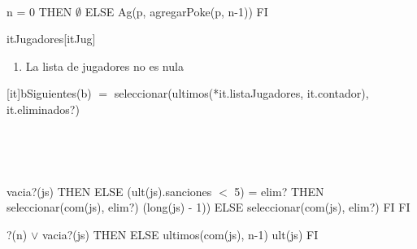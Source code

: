 \begin{Representacion}
	~

	{\IF n = 0 THEN
		$\emptyset$
	ELSE
		Ag(p, agregarPoke(p, n-1))
	FI}



	\begin{Estructura}{itJugadores}[itJug]
		\begin{Tupla}[itJug]
		\end{Tupla}
	\end{Estructura}


	\begin{enumerate}

		\item La lista de jugadores no es nula

	\end{enumerate}




	[it]{b}{Siguientes(b) $=$ seleccionar(ultimos(*it.listaJugadores, it.contador), it.eliminados?)}

	~



	~

	{\IF vacia?(js) THEN
		\secuvacia
	ELSE
		{\IF (ult(js).sanciones $<$ 5) = elim? THEN  seleccionar(com(js), elim?) \circulito (long(js) - 1)) ELSE seleccionar(com(js), elim?) FI}
	FI}

	{?(n) $\lor$ vacia?(js) THEN
		\secuvacia
	ELSE
		ultimos(com(js), n-1) \circulito ult(js)
	FI}
\end{Representacion}

